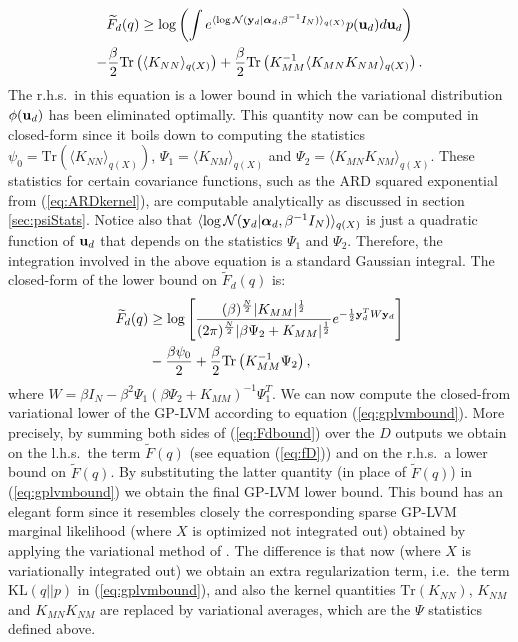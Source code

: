 \documentclass[twoside,times]{article}
\begin{document}
\begin{multline}
\widetilde{F}_d(q) 
\geq  \log \left( \int e^{ \langle \log \mathcal{N}(\mathbf{y}_d| \boldsymbol{\alpha}_d,
\beta^{-1} I_N) \rangle_{q(X)}} p(\mathbf{u}_d) d \mathbf{u}_d \right) \\
- \frac{\beta }{2} \text{Tr} \left( \langle K_{NN} \rangle_{q(X)} \right)
+ \frac{\beta }{2}  \text{Tr} \left( K_{MM}^{-1} \langle K_{MN}
K_{NM} \rangle_{q(X)} \right) \nonumber.    
\end{multline}
The r.h.s.\ in this equation is a lower bound in which the
variational distribution $\phi(\mathbf{u}_d)$ has been 
eliminated optimally.   
This quantity now can be computed in closed-form since it boils down
to computing the statistics $\psi_0 = \text{Tr} \left( \langle K_{NN}
\rangle_{q(X)} \right)$, $\Psi_1 = \langle K_{NM} \rangle_{q(X)}$
and $\Psi_2 = \langle K_{MN} K_{NM} \rangle_{q(X)}$. These statistics
for certain covariance functions, such as the ARD squared exponential
from (\ref{eq:ARDkernel}), are computable analytically as discussed in
section \ref{sec:psiStats}. Notice also that $\langle \log \mathcal{N}(\mathbf{y}_d|
\boldsymbol{\alpha}_d, \beta^{-1} I_N) \rangle_{q(X)}$ is just a quadratic function
of $\mathbf{u}_d$ that depends on the statistics $\Psi_1$ and
$\Psi_2$. Therefore, the integration involved in the above equation is
a standard Gaussian integral. The closed-form of the lower bound on 
$\widetilde{F}_d(q)$ is:
\begin{align}
\widetilde{F}_d(q) & \geq \log \left[ \frac{(\beta)^{\frac{N}{2}} |K_{MM}|^{\frac{1}{2}}}
{(2 \pi)^{\frac{N}{2}}|\beta \Psi_2 + K_{MM}|^{\frac{1}{2}}} 
e^{ - \frac{1}{2} \mathbf{y}_d^T W \mathbf{y}_d} \right] \nonumber \\
&  -  \frac{\beta \psi_0}{2}  +  
\frac{\beta}{2} \text{Tr} \left(K_{MM}^{-1} \Psi_2 \right),
\label{eq:Fdbound}
\end{align}
where $W = \beta I_N  -  \beta^2 \Psi_1 (
\beta \Psi_2 + K_{MM})^{-1} \Psi_1^T$. We can now compute the
closed-from variational lower of the GP-LVM 
according to equation (\ref{eq:gplvmbound}). More precisely, by
summing both sides of (\ref{eq:Fdbound}) over the $D$ outputs 
we obtain on the l.h.s.\ the term $\widetilde{F}(q)$ (see equation
(\ref{eq:fD})) and on the r.h.s.\ a lower bound on  
$\widetilde{F}(q)$. By substituting the latter quantity 
(in place of $\widetilde{F}(q)$) in (\ref{eq:gplvmbound}) 
we obtain the final GP-LVM lower bound.  
This bound has an elegant form since it resembles 
closely the corresponding sparse GP-LVM marginal likelihood (where $X$ is optimized not
integrated out) obtained  by applying 
the variational method  of
\citet{Titsias:variational09}. The difference is that now (where $X$
is variationally integrated out) we obtain
an extra regularization term, i.e.\ the term
$\text{KL}(q||p)$ in (\ref{eq:gplvmbound}), and also the kernel quantities 
$\text{Tr}(K_{NN})$, $K_{NM}$ and $K_{MN} K_{NM}$ are replaced by
variational averages, which are the $\Psi$ statistics defined above. 
  
\end{document}
